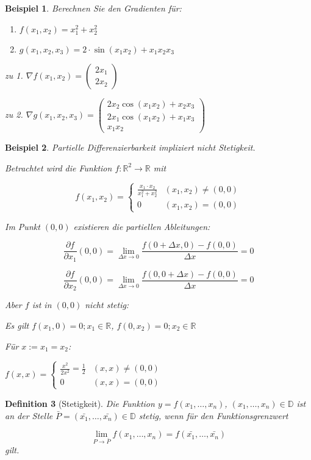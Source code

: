 \documentclass[12pt,a4paper]{scrreprt}
\newtheorem{defi}{Definition}[section]
\newtheorem{beispiel}[defi]{Beispiel}
\begin{document}
\begin{beispiel}
	Berechnen Sie den Gradienten für:
	\begin{enumerate}
		\item $f(x_1,x_2) = x_1^2 + x_2^2$
		\item $g(x_1,x_2,x_3) = 2 \cdot \sin(x_1 x_2) + x_1 x_2 x_3$
	\end{enumerate}

	zu 1. $\nabla f(x_1,x_2) = \begin{pmatrix}2x_1\\2x_2\end{pmatrix}$
	
	zu 2. $\nabla g(x_1,x_2,x_3) = \begin{pmatrix}2x_2 \cos(x_1 x_2)+x_2 x_3 \\ 2x_1 \cos(x_1 x_2)+x_1 x_3 \\ x_1 x_2\end{pmatrix}$
\end{beispiel}

\begin{beispiel}
	Partielle Differenzierbarkeit impliziert nicht Stetigkeit.
	
	Betrachtet wird die Funktion $f:\mathbb{R}^2\to\mathbb{R}$ mit
	
	\[f(x_1,x_2) = \begin{cases}
	\frac{x_1\cdot x_2}{x_1^2 + x_2^2} & (x_1,x_2) \ne (0,0) \\
	0 & (x_1,x_2) = (0,0)
	\end{cases}\]
	
	Im Punkt $(0,0)$ existieren die partiellen Ableitungen:
	
	\[\frac{\partial f}{\partial x_1}(0,0) = \lim_{\Delta x\to0}{\frac{f(0+\Delta x,0)-f(0,0)}{\Delta x}} = 0\]
	
	\[\frac{\partial f}{\partial x_2}(0,0) = \lim_{\Delta x\to0}{\frac{f(0,0+\Delta x)-f(0,0)}{\Delta x}} = 0\]
	
	Aber $f$ ist in $(0,0)$ nicht stetig:
	
	Es gilt $f(x_1,0) = 0; x_1 \in \mathbb{R}$, $f(0,x_2) = 0; x_2 \in \mathbb{R}$
	
	Für $x := x_1 = x_2$:
	
	$f(x,x)=\begin{cases}\frac{x^2}{2x^2}=\frac{1}{2} & (x,x) \ne (0,0) \\ 0 & (x,x) = (0,0)\end{cases}$
\end{beispiel}

\begin{defi}[Stetigkeit]
	Die Funktion $y=f(x_1,\dots,x_n)$, $(x_1,\dots,x_n)\in\mathbb{D}$ ist an der Stelle $\bar{P}=(\bar{x_1},\dots,\bar{x_n}) \in \mathbb{D}$ stetig, wenn für den Funktionsgrenzwert
	
	\[\lim_{P\to\bar{P}}{f(x_1,\dots,x_n)} = f(\bar{x_1},\dots,\bar{x_n})\] gilt.
\end{defi}
\end{document}
